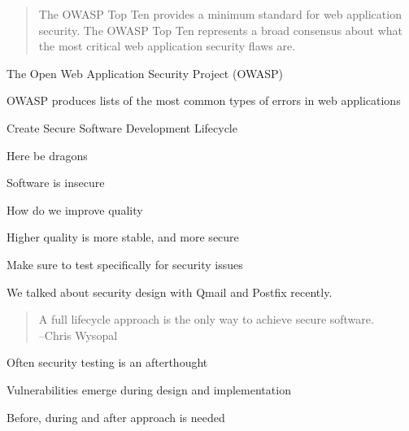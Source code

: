 \documentclass[Screen16to9,17pt]{foils}
\begin{document}
\begin{list2}
    \item\end{list2}





\begin{quote}
The OWASP Top Ten provides a minimum standard for web application
security. The OWASP Top Ten represents a broad consensus about what
the most critical web application security flaws are.
\end{quote}

\begin{list1}
\item The Open Web Application Security Project (OWASP)
\item OWASP produces lists of the most common types of errors in web applications
\item {}
\item Create Secure Software Development Lifecycle
\end{list1}






Here be dragons
\begin{list2}
\item Software is insecure
\item How do we improve quality
\item Higher quality is more stable, and more secure
\item Make sure to test specifically for security issues
\end{list2}

We talked about security design with Qmail and Postfix recently.




\begin{quote}
  A full lifecycle approach is the only way to achieve secure software.\\
  --Chris Wysopal
\end{quote}

\begin{list2}
\item Often security testing is an afterthought
\item Vulnerabilities emerge during design and implementation
\item Before, during and after approach is needed
\end{list2}
\end{document}

